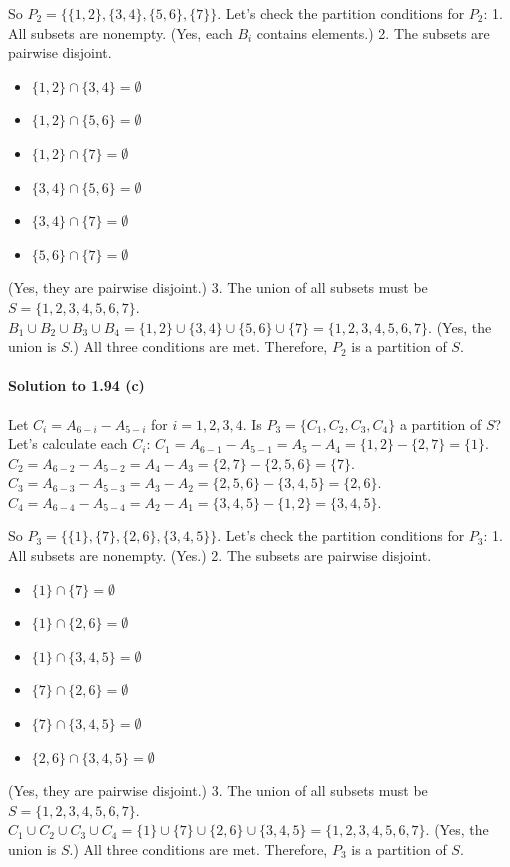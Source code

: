 \documentclass{article}
\begin{document}
\begin{itemize}
\begin{itemize}
\begin{itemize}
So $P_2 = \{\{1, 2\}, \{3, 4\}, \{5, 6\}, \{7\}\}$.
Let's check the partition conditions for $P_2$:
1.  All subsets are nonempty. (Yes, each $B_i$ contains elements.)
2.  The subsets are pairwise disjoint.
    \begin{itemize}
        \item $\{1, 2\} \cap \{3, 4\} = \emptyset$
        \item $\{1, 2\} \cap \{5, 6\} = \emptyset$
        \item $\{1, 2\} \cap \{7\} = \emptyset$
        \item $\{3, 4\} \cap \{5, 6\} = \emptyset$
        \item $\{3, 4\} \cap \{7\} = \emptyset$
        \item $\{5, 6\} \cap \{7\} = \emptyset$
    \end{itemize}
    (Yes, they are pairwise disjoint.)
3.  The union of all subsets must be $S = \{1, 2, 3, 4, 5, 6, 7\}$.
    $B_1 \cup B_2 \cup B_3 \cup B_4 = \{1, 2\} \cup \{3, 4\} \cup \{5, 6\} \cup \{7\} = \{1, 2, 3, 4, 5, 6, 7\}$.
    (Yes, the union is $S$.)
All three conditions are met. Therefore, $P_2$ is a partition of $S$.

\paragraph*{Solution to 1.94 (c)}
Let $C_i = A_{6-i} - A_{5-i}$ for $i = 1, 2, 3, 4$. Is $P_3 = \{C_1, C_2, C_3, C_4\}$ a partition of $S$?
Let's calculate each $C_i$:
$C_1 = A_{6-1} - A_{5-1} = A_5 - A_4 = \{1, 2\} - \{2, 7\} = \{1\}$.
$C_2 = A_{6-2} - A_{5-2} = A_4 - A_3 = \{2, 7\} - \{2, 5, 6\} = \{7\}$.
$C_3 = A_{6-3} - A_{5-3} = A_3 - A_2 = \{2, 5, 6\} - \{3, 4, 5\} = \{2, 6\}$.
$C_4 = A_{6-4} - A_{5-4} = A_2 - A_1 = \{3, 4, 5\} - \{1, 2\} = \{3, 4, 5\}$.

So $P_3 = \{\{1\}, \{7\}, \{2, 6\}, \{3, 4, 5\}\}$.
Let's check the partition conditions for $P_3$:
1.  All subsets are nonempty. (Yes.)
2.  The subsets are pairwise disjoint.
    \begin{itemize}
        \item $\{1\} \cap \{7\} = \emptyset$
        \item $\{1\} \cap \{2, 6\} = \emptyset$
        \item $\{1\} \cap \{3, 4, 5\} = \emptyset$
        \item $\{7\} \cap \{2, 6\} = \emptyset$
        \item $\{7\} \cap \{3, 4, 5\} = \emptyset$
        \item $\{2, 6\} \cap \{3, 4, 5\} = \emptyset$
    \end{itemize}
    (Yes, they are pairwise disjoint.)
3.  The union of all subsets must be $S = \{1, 2, 3, 4, 5, 6, 7\}$.
    $C_1 \cup C_2 \cup C_3 \cup C_4 = \{1\} \cup \{7\} \cup \{2, 6\} \cup \{3, 4, 5\} = \{1, 2, 3, 4, 5, 6, 7\}$.
    (Yes, the union is $S$.)
All three conditions are met. Therefore, $P_3$ is a partition of $S$.


\end{itemize}
\end{itemize}
\end{itemize}
\end{document}
